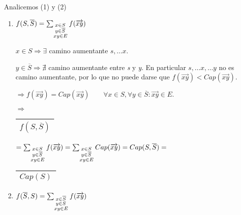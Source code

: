 \documentclass[12pt,a4paper]{report}
\begin{document}
				\vspace{2mm}
				Analicemos (1) y (2)
			\begin{enumerate}[(1)]
				\item $f(S, \overline{S}) = \sum_{\begin{subarray}{l} \; x \in S\\
				\; y \in \overline{S} \\ xy \in E\end{subarray}} f(\overrightarrow{xy}) $

				$x \in S \Rightarrow \exists$ camino aumentante $ s, \dotsc x$.

				$y \in \overline{S} \Rightarrow \nexists$ camino aumentante entre \textit{s} y \textit{y}. En particular $s, 	\dotsc x, \dotsc y$ no es camino aumentante, por lo que no puede darse que $f(\overrightarrow{xy}) < Cap(\overrightarrow{xy})$.

				\vspace{3mm}
				$\Rightarrow f(\overrightarrow{xy}) = Cap(\overrightarrow{xy}) \qquad \forall x \in S, \forall y \in \overline{S} : \overrightarrow{xy} \in E.$

				\vspace{3mm}
				$\Rightarrow$ \begin{tabular}{|c|} \hline $f(S, \overline{S})$ \\ \hline \end{tabular} $= \sum_{\begin{subarray}{l} \; x \in S\\  \; y \in \overline{S} \\ xy \in E\end{subarray}} f(\overrightarrow{xy}) = \sum_{\begin{subarray}{l} \; x \in S\\  \; y \in \overline{S} \\ xy \in E\end{subarray}} Cap(\overrightarrow{xy}) = Cap(S, \overline{S}) =$ \begin{tabular}{|c|} \hline $ Cap(S) $ \\ \hline \end{tabular}

				\item $f(\overline{S}, S) = \sum_{\begin{subarray}{l} \; x \in \overline{S}\\
				\; y \in S \\ xy \in E\end{subarray}} f(\overrightarrow{xy}) $


\end{enumerate}
\end{document}
